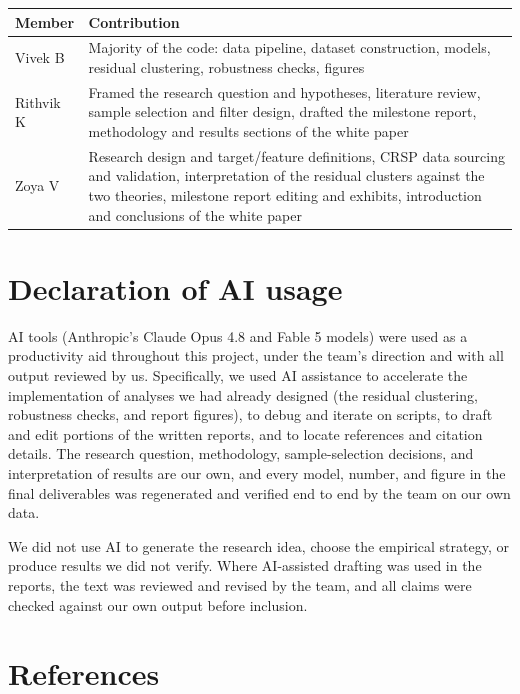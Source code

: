 \documentclass[11pt]{article}
\begin{document}
\begin{table}[H]
\centering
\begin{tabular}{p{0.75in}p{4.9in}}
\toprule
Member & Contribution \\
\midrule
Vivek B & Majority of the code: data pipeline, dataset construction, models,
residual clustering, robustness checks, figures \\
Rithvik K & Framed the research question and hypotheses, literature review,
sample selection and filter design, drafted the milestone report, methodology
and results sections of the white paper \\
Zoya V & Research design and target/feature definitions, CRSP data sourcing
and validation, interpretation of the residual clusters against the two
theories, milestone report editing and exhibits, introduction and conclusions
of the white paper \\
\bottomrule
\end{tabular}
\end{table}

\section{Declaration of AI usage}

AI tools (Anthropic's Claude Opus 4.8 and Fable 5 models) were used as a
productivity aid throughout this project, under the team's direction and with
all output reviewed by us. Specifically, we used AI assistance to accelerate
the implementation of analyses we had already designed (the residual
clustering, robustness checks, and report figures), to debug and iterate on
scripts, to draft and edit portions of the written reports, and to locate
references and citation details. The research question, methodology,
sample-selection decisions, and interpretation of results are our own, and
every model, number, and figure in the final deliverables was regenerated and
verified end to end by the team on our own data.

We did not use AI to generate the research idea, choose the empirical
strategy, or produce results we did not verify. Where AI-assisted drafting
was used in the reports, the text was reviewed and revised by the team, and
all claims were checked against our own output before inclusion.

\section*{References}
\end{document}
